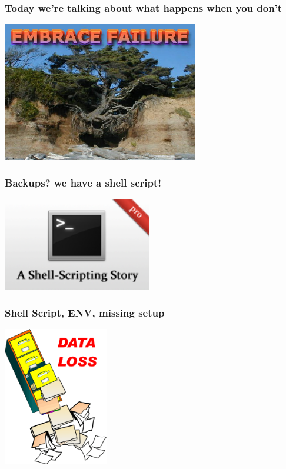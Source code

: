 \documentclass{beamer}
\begin{document}
\begin{frame}
  \frametitle{Today we're talking about what happens when you don't}

  \begin{center}
    \includegraphics[height=2.4in]{resilience_logo.jpg}
  \end{center}
\end{frame}

\begin{frame}
  \frametitle{Backups? we have a shell script!}

  \begin{center}
    \includegraphics[height=1.6in]{a-shell-scripting-story.png}
  \end{center}
\end{frame}

\begin{frame}[fragile]
  \frametitle{Shell Script, ENV, missing setup}


  \begin{center}
    \includegraphics[height=2.4in]{data_loss.png}
  \end{center}
\end{frame}
\end{document}
